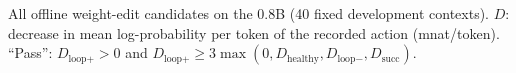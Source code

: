 \begin{table}[h]
\centering\scriptsize
\resizebox{\linewidth}{!}{}
\caption{All offline weight-edit candidates on the 0.8B (40 fixed development contexts). $D$: decrease in mean log-probability per token of the recorded action (mnat/token). ``Pass'': $D_{\text{loop+}}>0$ and $D_{\text{loop+}}\ge3\max(0,D_{\text{healthy}},D_{\text{loop}-},D_{\text{succ}})$.}
\label{tab:candidates}
\end{table}

